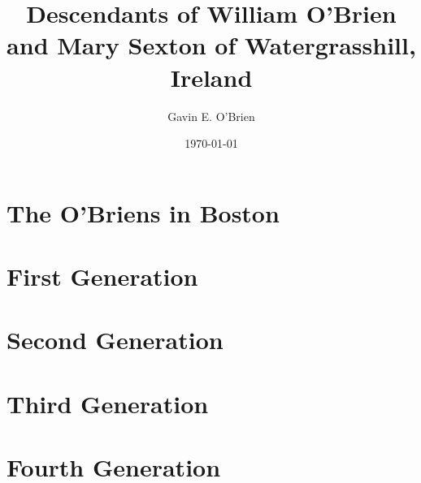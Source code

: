 \documentclass[oneside,letterpaper,12pt]{memoir}
\begin{document}
\author{Gavin E. O'Brien}
\title{Descendants of William O'Brien and Mary Sexton of Watergrasshill, Ireland}
\date{\today}

\maketitle
\tableofcontents

\renewcommand\bibsection{\section*{Citations}} %

% 

\chapter{The O'Briens in Boston}

\chapter{First Generation}

\chapter{Second Generation}





\chapter{Third Generation}







\chapter{Fourth Generation}

















% 

\clearpage

\printindex
\end{document}
